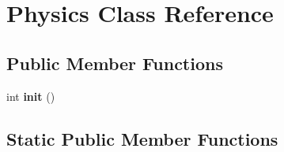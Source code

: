 \hypertarget{class_physics}{}\section{Physics Class Reference}
\label{class_physics}
\subsection*{Public Member Functions}
\begin{DoxyCompactItemize}
\item 
\hypertarget{class_physics_ae1a4865b4344594f83a6e5e0baad2a9a}{}int {\bfseries init} ()\label{class_physics_ae1a4865b4344594f83a6e5e0baad2a9a}

\end{DoxyCompactItemize}
\subsection*{Static Public Member Functions}
